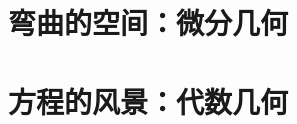 \documentclass[UTF8,a4paper]{ctexbook}
\begin{document}
\part{弯曲的空间：微分几何}

\part{方程的风景：代数几何}

\end{document}

